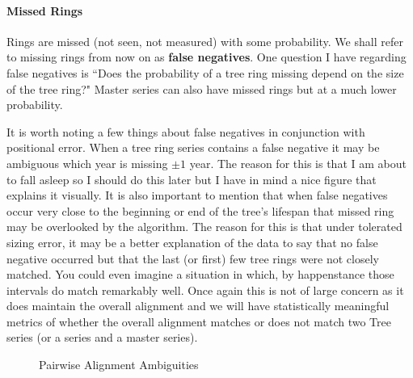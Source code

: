 \documentclass[11pt]{article}
\begin{document}
\paragraph{Missed Rings\newline}\par{
Rings are missed (not seen, not measured) with some probability. We shall refer to missing rings from now on as \textbf{false negatives}. One question I have regarding false negatives is ``Does the probability of a tree ring missing depend on the size of the tree ring?" Master series can also have missed rings but at a much lower probability.
}
\par{
It is worth noting a few things about false negatives in conjunction with positional error. When a tree ring series contains a false negative it may be ambiguous which year is missing $\pm1$ year. The reason for this is that I am about to fall asleep so I should do this later but I have in mind a nice figure that explains it visually. It is also important to mention that when false negatives occur very close to the beginning or end of the tree's lifespan that missed ring may be overlooked by the algorithm. The reason for this is that under tolerated sizing error, it may be a better explanation of the data to say that no false negative occurred but that the last (or first) few tree rings were not closely matched. You could even imagine a situation in which, by happenstance those intervals do match remarkably well. Once again this is not of large concern as it does maintain the overall alignment and we will have statistically meaningful metrics of whether the overall alignment matches or does not match two Tree series (or a series and a master series).
\begin{figure}[h!]
 \caption{Pairwise Alignment Ambiguities}
\begin{center}
\end{center}
\end{figure}}
\end{document}
